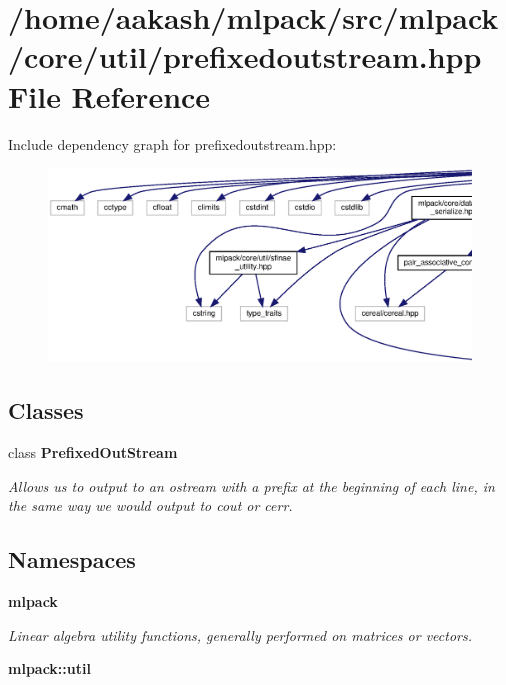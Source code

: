 \section{/home/aakash/mlpack/src/mlpack/core/util/prefixedoutstream.hpp File Reference}
\label{prefixedoutstream_8hpp}
Include dependency graph for prefixedoutstream.\+hpp\+:
\nopagebreak
\begin{figure}[H]
\begin{center}
\leavevmode
\includegraphics[width=350pt]{prefixedoutstream_8hpp__incl}
\end{center}
\end{figure}
\subsection*{Classes}
\begin{DoxyCompactItemize}
\item 
class \textbf{ Prefixed\+Out\+Stream}
\begin{DoxyCompactList}\small\item\em Allows us to output to an ostream with a prefix at the beginning of each line, in the same way we would output to cout or cerr. \end{DoxyCompactList}\end{DoxyCompactItemize}
\subsection*{Namespaces}
\begin{DoxyCompactItemize}
\item 
 \textbf{ mlpack}
\begin{DoxyCompactList}\small\item\em Linear algebra utility functions, generally performed on matrices or vectors. \end{DoxyCompactList}\item 
 \textbf{ mlpack\+::util}
\end{DoxyCompactItemize}


